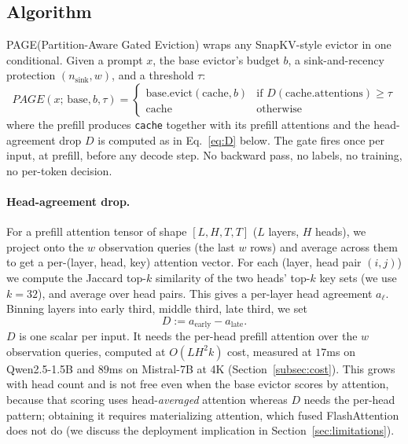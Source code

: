 \documentclass{article}
\newcommand{\method}{PAGE\xspace}
\begin{document}
\subsection{Algorithm}
\label{subsec:algo}

\method (Partition-Aware Gated Eviction) wraps any SnapKV-style evictor in one
conditional. Given a prompt
$x$, the base evictor's budget $b$, a sink-and-recency protection
$(n_{\text{sink}}, w)$, and a threshold $\tau$:
\begin{equation}
\boxed{\
\method(x;\, \text{base}, b, \tau) =
\begin{cases}
\text{base.evict}(\text{cache}, b) & \text{if } D(\text{cache}.\text{attentions}) \ge \tau \\
\text{cache} & \text{otherwise}
\end{cases}\
}
\end{equation}
where the prefill produces \texttt{cache} together with its prefill attentions
and the head-agreement drop $D$ is computed as in Eq.~\eqref{eq:D} below.
The gate fires once per input, at prefill, before any decode step. No backward
pass, no labels, no training, no per-token decision.

\paragraph{Head-agreement drop.} For a prefill attention tensor of shape
$[L, H, T, T]$ ($L$ layers, $H$ heads), we project onto the $w$ observation
queries (the last $w$ rows) and average across them to get a per-(layer, head,
key) attention vector. For each (layer, head pair $(i, j)$) we compute the
Jaccard top-$k$ similarity of the two heads' top-$k$ key sets (we use $k = 32$),
and average over head pairs. This gives a per-layer head agreement
$a_\ell$. Binning layers into early third, middle third, late third, we set
\begin{equation}
\label{eq:D}
D := a_{\text{early}} - a_{\text{late}}.
\end{equation}
$D$ is one scalar per input. It needs the per-head prefill attention over the
$w$ observation queries, computed at $O(L H^2 k)$ cost, measured at $17$ms on
Qwen2.5-1.5B and $89$ms on Mistral-7B at 4K (Section~\ref{subsec:cost}). This
grows with head count and is not free even when the base evictor scores by
attention, because that scoring uses head-\emph{averaged} attention whereas $D$
needs the per-head pattern; obtaining it requires materializing attention, which
fused FlashAttention does not do (we discuss the deployment implication in
Section~\ref{sec:limitations}).
\end{document}
